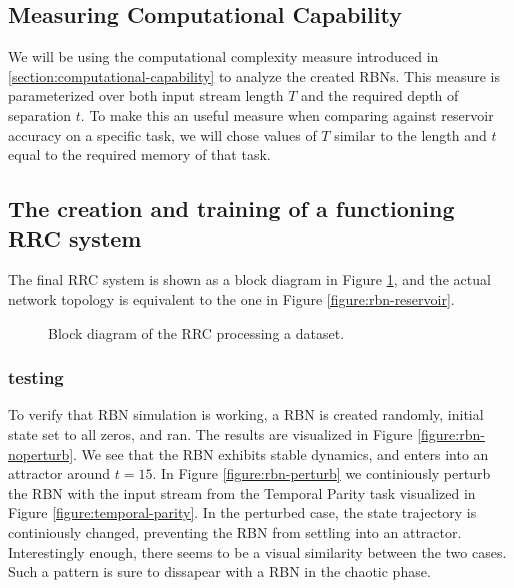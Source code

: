 \subsection{Measuring Computational Capability}

We will be using the computational complexity measure introduced in \ref{section:computational-capability} to analyze the created RBNs.
This measure is parameterized over both input stream length $T$ and the required depth of separation $t$.
To make this an useful measure when comparing against reservoir accuracy on a specific task,
we will chose values of $T$ similar to the length and $t$ equal to the required memory of that task.

\subsection{The creation and training of a functioning RRC system}

The final RRC system is shown as a block diagram in Figure \ref{figure:rrc-block},
and the actual network topology is equivalent to the one in Figure \ref{figure:rbn-reservoir}.

\begin{figure}
  \centering
  \caption{Block diagram of the RRC processing a dataset.}
  \label{figure:rrc-block}
\end{figure}

\subsubsection{testing}

To verify that RBN simulation is working,
a RBN is created randomly, initial state set to all zeros, and ran.
The results are visualized in Figure \ref{figure:rbn-noperturb}.
We see that the RBN exhibits stable dynamics, and enters into an attractor around $t=15$.
In Figure \ref{figure:rbn-perturb} we continiously perturb the RBN with the input stream from the Temporal Parity task visualized in Figure \ref{figure:temporal-parity}.
In the perturbed case, the state trajectory is continiously changed, preventing the RBN from settling into an attractor.
Interestingly enough, there seems to be a visual similarity between the two cases.
Such a pattern is sure to dissapear with a RBN in the chaotic phase.

